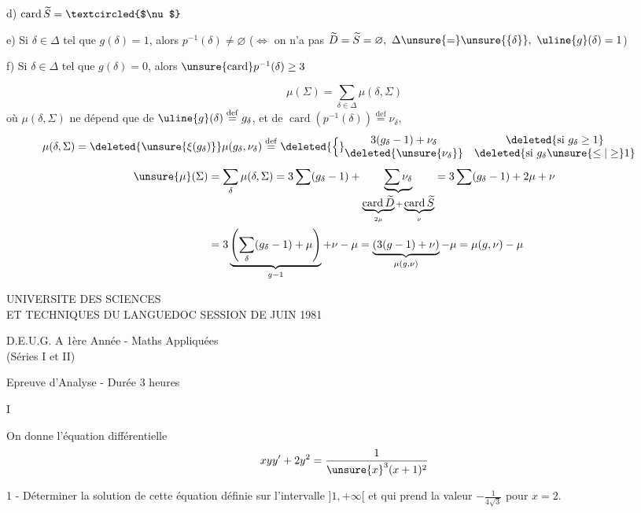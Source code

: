 d) $\operatorname{card}\widetilde S=\textcircled{$\nu$}$

e) Si $\delta\in\Delta$ tel que $g(\delta)=1$, alors
$p^{-1}(\delta)\neq\varnothing$
($\Longleftrightarrow$ on n'a pas
$\widetilde D=\widetilde S=\varnothing,\ \Delta\unsure{=}\unsure{\{\delta\}},
\ \uline{g}(\delta)=1$)

f) Si $\delta\in\Delta$ tel que $g(\delta)=0$, alors
$\unsure{\operatorname{card}}p^{-1}(\delta)\geq3$

\[
\mu(\Sigma)=\sum_{\delta\in\Delta}\mu(\delta,\Sigma)
\]
où $\mu(\delta,\Sigma)$ ne dépend que de
$\uline{g}(\delta)\overset{\mathrm{def}}=g_\delta$, et de
$\operatorname{card}(p^{-1}(\delta))\overset{\mathrm{def}}=\nu_\delta$,
\[
\begin{aligned}
\mu(\delta,\Sigma)&=
\deleted{\unsure{\xi(g_\delta)}}
\mu(g_\delta,\nu_\delta)
\overset{\mathrm{def}}=
\deleted{\Big\{}
\begin{matrix}
3(g_\delta-1)+\nu_\delta&
\deleted{\text{si }g_\delta\geq1}\\
\deleted{\unsure{\nu_\delta}}&
\deleted{\text{si }g_\delta\unsure{\leq|\geq}1}
\end{matrix}
\end{aligned}
\]
\[
\begin{aligned}
\unsure{\mu}(\Sigma)
&=\sum_\delta\mu(\delta,\Sigma)
=3\sum(g_\delta-1)
+\underbrace{\sum\nu_\delta}_{
\underbrace{\operatorname{card}\widetilde D}_{2\mu}
+\underbrace{\operatorname{card}\widetilde S}_{\nu}}
=3\sum(g_\delta-1)+2\mu+\nu\\
&=3\underbrace{\left(\sum_\delta(g_\delta-1)+\mu\right)}_{g-1}
+\nu-\mu
=\underbrace{(3(g-1)+\nu)}_{\mu(g,\nu)}-\mu
=\mu(g,\nu)-\mu
\end{aligned}
\]


UNIVERSITE DES SCIENCES\\
ET TECHNIQUES DU LANGUEDOC
\hfill SESSION DE JUIN 1981

\begin{center}
D.E.U.G. A 1ère Année - Maths Appliquées\\
(Séries I et II)

Epreuve d'Analyse - Durée 3 heures

I
\end{center}

On donne l'équation différentielle
\[
xyy'+2y^2=\frac{1}{\unsure{x}^3(x+1)^2}
\]

1 - Déterminer la solution de cette équation définie sur l'intervalle $]1,+\infty[$
et qui prend la valeur $-\frac{1}{4\sqrt3}$ pour $x=2$.

